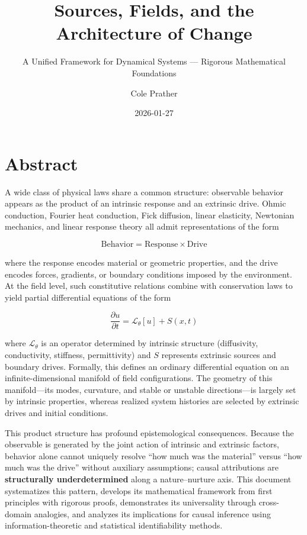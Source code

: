 \documentclass[
]{article}
\title{Sources, Fields, and the Architecture of Change}
\subtitle{A Unified Framework for Dynamical Systems --- Rigorous
Mathematical Foundations}
\author{Cole Prather}
\date{2026-01-27}
\renewcommand*\contentsname{Table of contents}
\newcommand\contentsname{Table of contents}
\begin{document}
\maketitle

\renewcommand*\contentsname{Table of contents}
{
\hypersetup{linkcolor=}
\setcounter{tocdepth}{3}
\tableofcontents
}

\section*{Abstract}\label{abstract}

A wide class of physical laws share a common structure: observable
behavior appears as the product of an intrinsic response and an
extrinsic drive. Ohmic conduction, Fourier heat conduction, Fick
diffusion, linear elasticity, Newtonian mechanics, and linear response
theory all admit representations of the form

\[\text{Behavior} = \text{Response} \times \text{Drive}\]

where the response encodes material or geometric properties, and the
drive encodes forces, gradients, or boundary conditions imposed by the
environment. At the field level, such constitutive relations combine
with conservation laws to yield partial differential equations of the
form

\[\frac{\partial u}{\partial t} = \mathcal{L}_\theta[u] + S(x,t)\]

where \(\mathcal{L}_\theta\) is an operator determined by intrinsic
structure (diffusivity, conductivity, stiffness, permittivity) and \(S\)
represents extrinsic sources and boundary drives. Formally, this defines
an ordinary differential equation on an infinite-dimensional manifold of
field configurations. The geometry of this manifold---its modes,
curvature, and stable or unstable directions---is largely set by
intrinsic properties, whereas realized system histories are selected by
extrinsic drives and initial conditions.

This product structure has profound epistemological consequences.
Because the observable is generated by the joint action of intrinsic and
extrinsic factors, behavior alone cannot uniquely resolve ``how much was
the material'' versus ``how much was the drive'' without auxiliary
assumptions; causal attributions are \textbf{structurally
underdetermined} along a nature--nurture axis. This document
systematizes this pattern, develops its mathematical framework from
first principles with rigorous proofs, demonstrates its universality
through cross-domain analogies, and analyzes its implications for causal
inference using information-theoretic and statistical identifiability
methods.
\end{document}
